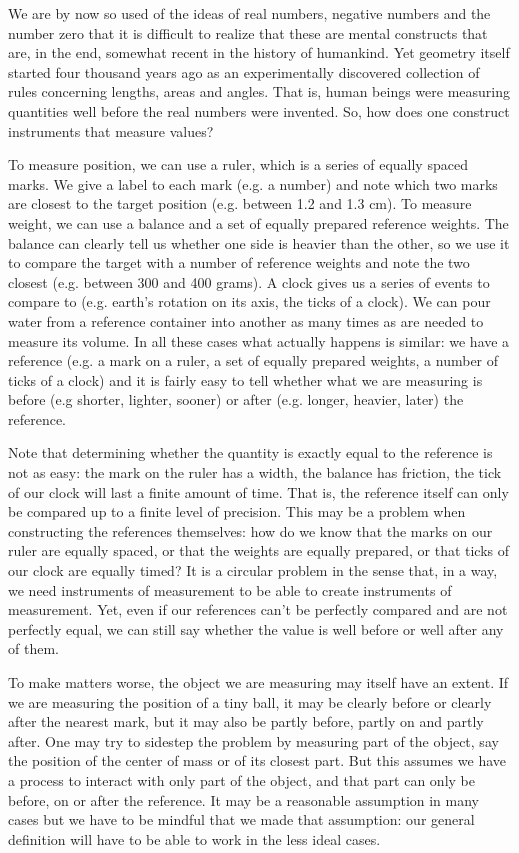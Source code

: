 \documentclass[11pt,letterpaper,fleqn]{memoir} %
\begin{document}
We are by now so used of the ideas of real numbers, negative numbers and the number zero that it is difficult to realize that these are mental constructs that are, in the end, somewhat recent in the history of humankind. Yet geometry itself started four thousand years ago as an experimentally discovered collection of rules concerning lengths, areas and angles. That is, human beings were measuring quantities well before the real numbers were invented. So, how does one construct instruments that measure values?

To measure position, we can use a ruler, which is a series of equally spaced marks. We give a label to each mark (e.g. a number) and note which two marks are closest to the target position (e.g. between 1.2 and 1.3 cm). To measure weight, we can use a balance and a set of equally prepared reference weights. The balance can clearly tell us whether one side is heavier than the other, so we use it to compare the target with a number of reference weights and note the two closest (e.g. between 300 and 400 grams). A clock gives us a series of events to compare to (e.g. earth's rotation on its axis, the ticks of a clock). We can pour water from a reference container into another as many times as are needed to measure its volume. In all these cases what actually happens is similar: we have a reference (e.g. a mark on a ruler, a set of equally prepared weights, a number of ticks of a clock) and it is fairly easy to tell whether what we are measuring is before (e.g shorter, lighter, sooner) or after (e.g. longer, heavier, later) the reference.

Note that determining whether the quantity is exactly equal to the reference is not as easy: the mark on the ruler has a width, the balance has friction, the tick of our clock will last a finite amount of time. That is, the reference itself can only be compared up to a finite level of precision. This may be a problem when constructing the references themselves: how do we know that the marks on our ruler are equally spaced, or that the weights are equally prepared, or that ticks of our clock are equally timed? It is a circular problem in the sense that, in a way, we need instruments of measurement to be able to create instruments of measurement. Yet, even if our references can't be perfectly compared and are not perfectly equal, we can still say whether the value is well before or well after any of them.

To make matters worse, the object we are measuring may itself have an extent. If we are measuring the position of a tiny ball, it may be clearly before or clearly after the nearest mark, but it may also be partly before, partly on and partly after. One may try to sidestep the problem by measuring part of the object, say the position of the center of mass or of its closest part. But this assumes we have a process to interact with only part of the object, and that part can only be before, on or after the reference. It may be a reasonable assumption in many cases but we have to be mindful that we made that assumption: our general definition will have to be able to work in the less ideal cases.
\end{document}
